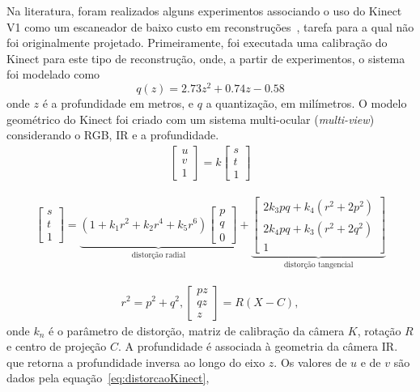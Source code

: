 Na literatura, foram realizados alguns experimentos associando o uso do Kinect V1 como um
escaneador de baixo custo em reconstruções~\cite{smisek20133d}, tarefa para a qual não foi
originalmente projetado. Primeiramente, foi executada uma calibração do
Kinect para este tipo de reconstrução, onde, a partir de experimentos, o sistema
foi modelado como
\begin{equation}
\label{eq:kinectCalibracao}
q(z)=2.73z^{2}+0.74z-0.58
\end{equation}
onde $z$ é a profundidade em metros, e $q$ a quantização, em milímetros.
O modelo geométrico do Kinect foi criado com um sistema multi-ocular
(\emph{multi-view}) considerando o RGB, IR e a profundidade.
\begin{gather} 
\label{eq:matrix}
\begin{bmatrix}
u\\
v\\
1
\end{bmatrix} 
= k
\begin{bmatrix}
s\\
t\\
1
\end{bmatrix}
\end{gather}

\begin{gather} 
\begin{bmatrix}
s\\
t\\
1
\end{bmatrix} 
= 
\underbrace{(1 + k_1r^2 + k_2r^4 + k_5r^6) 
\begin{bmatrix}
p\\
q\\
0
\end{bmatrix} }_{\text{distorção radial}} 
+
\underbrace{
\begin{bmatrix}
2k_3pq+k_4(r^2+2p^2)\\
2k_4pq+k_3(r^2+2q^2)\\
1
\end{bmatrix} }_{\text{distorção tangencial}}
\label{eq:distorcaoKinect}
\end{gather}

\begin{gather}
r^2 = p^2+q^2, 
\begin{bmatrix}
pz\\ 
qz\\ 
z
\end{bmatrix} = R(X-C),
\label{eq:relacaoKinect}
\end{gather}
onde $k_n$ é o parâmetro de distorção, matriz de calibração da câmera $K$,
rotação $R$ e centro de projeção $C$.
A profundidade é associada à geometria da câmera IR. que retorna a profundidade inversa ao longo do eixo $z$.
Os valores de $u$ e de $v$ são dados pela equação~\ref{eq:distorcaoKinect}, %

